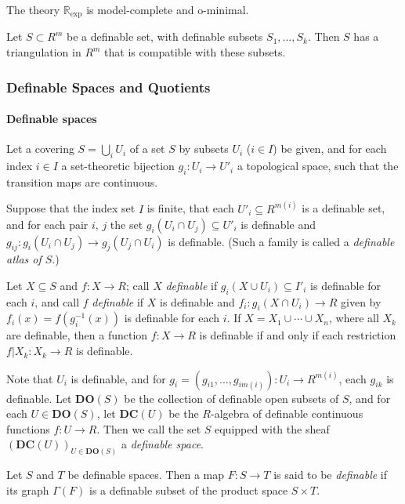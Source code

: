 \documentclass[
	fontsize=10pt, %
]{kaohandt}
\begin{document}
\begin{theorem}
    The theory $\mathbb{R}_{\exp}$ is model-complete and o-minimal.
\end{theorem}

\begin{theorem}
    Let $S \subset R^m$ be a definable set,
    with definable subsets $S_1,\dots,S_k$.
    Then $S$ has a triangulation in $R^m$ that is compatible with these subsets.
\end{theorem}

\subsubsection{Definable Spaces and Quotients}
\paragraph{\bfseries Definable spaces}
Let a covering $S = \bigcup_i U_i$ of a set $S$ by subsets $U_i$ ($i\in I$) be given,
and for each index $i \in I$ a set-theoretic bijection $g_i: U_i \to U'_i$ a topological space,
such that the transition maps are continuous.

Suppose that the index set $I$ is finite,
that each $U'_i \subseteq R^{m(i)}$ is a definable set,
and for each pair $i$, $j$ the set $g_i(U_i\cap U_j) \subseteq U'_i$
is definable and $g_{ij}: g_i(U_i\cap U_j) \to g_j(U_j\cap U_i)$ is definable.
(Such a family is called a \emph{definable atlas of $S$}.)

Let $X \subseteq S$ and $f : X \to R$;
call $X$ \emph{definable} if $g_i(X\cup U_i) \subseteq I'_i$ is definable for each $i$,
and call $f$ \emph{definable} if $X$ is definable and 
$f_i : g_i(X \cap U_i) \to R$ given by $f_i(x) = f(g_i^{-1}(x))$ is definable for each $i$.
If $X = X_1\cup \cdots \cup X_n$,
where all $X_k$ are definable,
then a function $f: X \to R$ is definable if and only if each restriction $f|X_k: X_k \to R$ is definable.

Note that $U_i$ is definable,
and for $g_i = (g_{i1},\dots,g_{im(i)}) : U_i \to R^{m(i)}$,
each $g_{ik}$ is definable.
Let $\mathbf{DO}(S)$ be the collection of definable open subsets of $S$,
and for each $U \in \mathbf{DO}(S)$,
let $\mathbf{DC}(U)$ be the $R$-algebra of definable continuous functions $f: U \to R$.
Then we call the set $S$ equipped with the sheaf $(\mathbf{DC}(U))_{U \in \mathbf{DO}(S)}$ a \emph{definable space}.

\begin{definition}
    Let $S$ and $T$ be definable spaces.
    Then a map $F: S \to T$ is said to be \emph{definable} if its graph $\Gamma(F)$ is a definable subset of the product space $S \times T$.
\end{definition}
\end{document}
